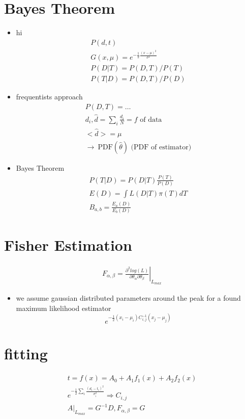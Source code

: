 \documentclass[twocolumn, a4paper, 11pt]{scrartcl}
\begin{document}
    \section{Bayes Theorem}\label{bayes-theorem}

    \begin{itemize}
    \item hi
      \begin{align*}
        P(d, t)\\
        G(x, \mu) = e^{-\frac 1 2 \frac{(x-\mu)^2}{\sigma^2}}\\
        P(D|T) = P(D,T)/P(T)\\
        P(T|D) = P(D,T)/P(D)
      \end{align*}
    \item frequentists approach
      \begin{align*}
        P(D,T) = \ldots\\
        d_i, \hat d = \sum_i \frac{d_i}{N} = f\text{ of data}\\
        < \hat d > = \mu\\
        \rightarrow\ \text{PDF}(\hat \theta)\text{ (PDF of estimator)}
      \end{align*}

    \item Bayes Theorem
      \begin{align*}
        P(T|D) = P(D|T) \frac{P(T)}{P(D)}\\
        E(D) = \int L(D|T) \pi(T) dT\\
        B_{a,b} = \frac{E_a(D)}{E_b(D)}
      \end{align*}

    \end{itemize}

    \section{Fisher Estimation}

    \begin{align*}
      F_{\alpha, \beta} = \left. \frac{\partial^2 log(L)}{\partial  \theta_\alpha \partial \theta_\beta} \right|_{L_{max}}
    \end{align*}

    \begin{itemize}
    \item
      we assume gaussian distributed parameters around the peak for a found maximum
      likelihood estimator
      \[
        e^{-\frac 12 (x_i-\mu_i)  C_{i,j}^{-1} (x_j-\mu_j)}
      \]
    \end{itemize}

    \section{fitting}\label{fitting}

    \begin{align*}
      t = f(x) = A_0 + A_1  f_1(x) + A_2  f_2(x)\\
      e^{-\frac12 \sum_i \frac{(d_i-t_i)^2}{\sigma_i^2} }
      \Rightarrow C_{i,j}\\
      A |_{L_{max}} = G^{-1} D, F_{\alpha, \beta} = G
    \end{align*}
\end{document}
